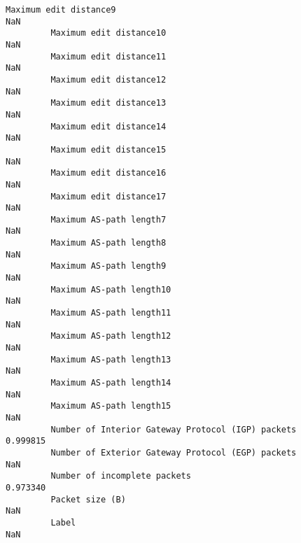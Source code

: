 \documentclass[11pt]{article}
\begin{document}
\begin{Verbatim}[commandchars=\\\{\}]
         Maximum edit distance9                                                 NaN   
         Maximum edit distance10                                                NaN   
         Maximum edit distance11                                                NaN   
         Maximum edit distance12                                                NaN   
         Maximum edit distance13                                                NaN   
         Maximum edit distance14                                                NaN   
         Maximum edit distance15                                                NaN   
         Maximum edit distance16                                                NaN   
         Maximum edit distance17                                                NaN   
         Maximum AS-path length7                                                NaN   
         Maximum AS-path length8                                                NaN   
         Maximum AS-path length9                                                NaN   
         Maximum AS-path length10                                               NaN   
         Maximum AS-path length11                                               NaN   
         Maximum AS-path length12                                               NaN   
         Maximum AS-path length13                                               NaN   
         Maximum AS-path length14                                               NaN   
         Maximum AS-path length15                                               NaN   
         Number of Interior Gateway Protocol (IGP) packets                 0.999815   
         Number of Exterior Gateway Protocol (EGP) packets                      NaN   
         Number of incomplete packets                                      0.973340   
         Packet size (B)                                                        NaN   
         Label                                                                  NaN   
         

\end{Verbatim}
\end{document}
